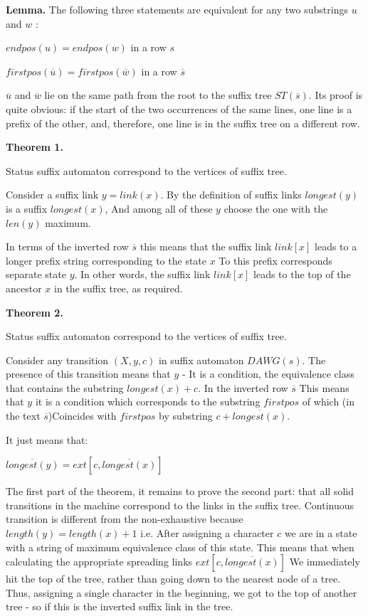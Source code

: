 \textbf{Lemma.} The following three statements are equivalent for any two substrings $u$ and $w$ :

$endpos (u) = endpos (w)$ in a row $s$

$firstpos (\overline {u}) = firstpos (\overline {w})$ in a row $\overline {s}$

$\overline {u}$ and $\overline {w}$ lie on the same path from the root to the suffix tree $ST (\overline {s})$.
Its proof is quite obvious: if the start of the two occurrences of the same lines, one line is a prefix of the other, and, therefore, one line is in the suffix tree on a different row.

\textbf{Theorem 1.}

Status suffix automaton correspond to the vertices of suffix tree.

Consider a suffix link $y = link (x)$. By the definition of suffix links $longest (y)$ is a suffix $longest (x)$, And among all of these $y$ choose the one with the $len (y)$ maximum.

In terms of the inverted row $\overline {s}$ this means that the suffix link $link [x]$ leads to a longer prefix string corresponding to the state $x$ To this prefix corresponds separate state $y$. In other words, the suffix link $link [x]$ leads to the top of the ancestor $x$ in the suffix tree, as required.

\textbf{Theorem 2.}

Status suffix automaton correspond to the vertices of suffix tree.

Consider any transition $(X, y, c)$ in suffix automaton $DAWG (s)$. The presence of this transition means that $y$ - It is a condition, the equivalence class that contains the substring $longest (x) + c$. In the inverted row $\overline {s}$ This means that $y$ it is a condition which corresponds to the substring $firstpos$ of which (in the text $\overline {s}$)Coincides with $firstpos$ by substring $c + \overline {longest (x)}$.

It just means that:

$\overline{longest(y)}=ext[c,\overline{longest(x)}]$

The first part of the theorem, it remains to prove the second part: that all solid transitions in the machine correspond to the links in the suffix tree. Continuous transition is different from the non-exhaustive because $length (y) = length (x) + 1$ i.e. After assigning a character $c$ we are in a state with a string of maximum equivalence class of this state. This means that when calculating the appropriate spreading links $ext [c, \overline {longest (x)}]$ We immediately hit the top of the tree, rather than going down to the nearest node of a tree. Thus, assigning a single character in the beginning, we got to the top of another tree - so if this is the inverted suffix link in the tree.


